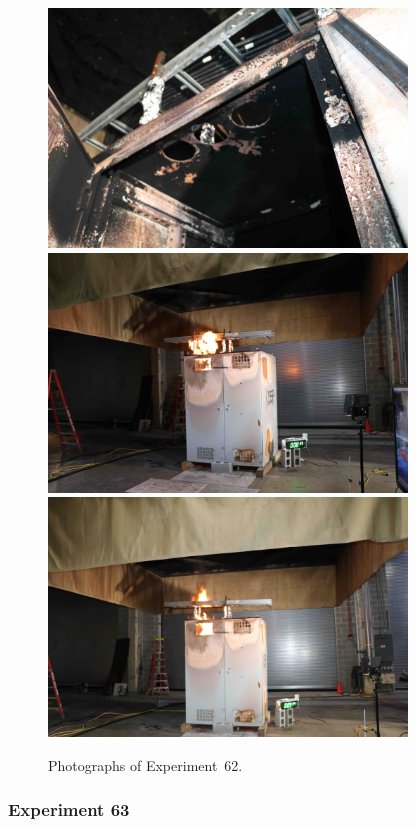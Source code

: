 \begin{figure}[p]
\centering
\includegraphics[height=2.50in]{../FIGURES/Test_62_cables} \\
\includegraphics[height=2.50in]{../FIGURES/Test_62_8_min_35_s} \\
\includegraphics[height=2.50in]{../FIGURES/Test_62_9_min_34_s}
\caption[Photographs of Experiment~62]{Photographs of Experiment~62.}
\label{fig:Test_62_photos}
\end{figure}


\clearpage

\subsubsection{Experiment 63}

